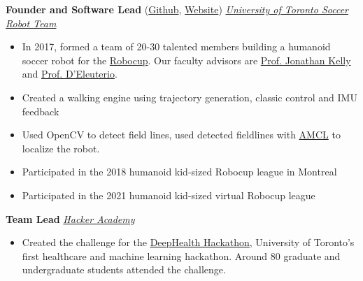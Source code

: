 \documentclass[11pt, a4paper]{cv}
\begin{document}
	\textbf{Founder and Software Lead} (\href{https://github.com/utra-robosoccer/soccer_ws} {Github}, \href{http://utrahumanoid.ca/our-project/}{Website}) \hfill \emph{\href{http://www.utrahumanoid.ca}{University of Toronto Soccer Robot Team}}
	\begin{itemize}
		\item In 2017, formed a team of 20-30 talented members building a humanoid soccer robot for the \href{https://www.robocup.org/}{Robocup}. Our faculty advisors are \href{http://stars.utias.utoronto.ca/~jkelly/}{Prof. Jonathan Kelly} and \href{http://www.utias.utoronto.ca/research/space-robotics/}{Prof. D’Eleuterio}.
		\item Created a walking engine using trajectory generation, classic control and IMU feedback
		\item Used OpenCV to detect field lines, used detected fieldlines with \href{http://wiki.ros.org/amcl}{AMCL} to localize the robot.
		\item Participated in the 2018 humanoid kid-sized Robocup league in Montreal
		\item Participated in the 2021 humanoid kid-sized virtual Robocup league 
	\end{itemize}
	
	\textbf{Team Lead} \hfill \emph{\href{https://www.facebook.com/hackeracademy/}{Hacker Academy}}
	\begin{itemize}
		\item Created the challenge for the \href{https://www.facebook.com/groups/1126158850825448/}{DeepHealth Hackathon}, University of Toronto's first healthcare and machine learning hackathon. Around 80 graduate and undergraduate students attended the challenge.
	\end{itemize}
\end{document}
